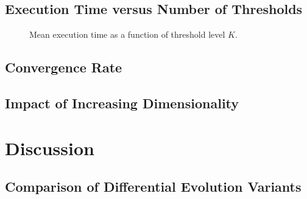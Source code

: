 \documentclass[review]{elsarticle}
\begin{document}
\subsection{Execution Time versus Number of Thresholds}

\begin{figure}[H]
    \centering
    \caption{Mean execution time as a function of threshold level $K$.}
    \label{fig:runtime}
\end{figure}

%


\subsection{Convergence Rate}



\subsection{Impact of Increasing Dimensionality}

%
%
%





\section{Discussion}
\label{sec:discussion}

%
%


\subsection{Comparison of Differential Evolution Variants}

%
%
%
%
%
\end{document}
